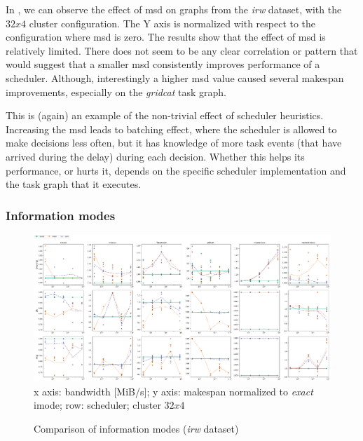 In , we can observe the effect of \gls{msd} on graphs from the
\emph{irw} dataset, with the $32x4$ cluster configuration. The Y axis
is normalized with respect to the configuration where \gls{msd} is zero. The results
show that the effect of \gls{msd} is relatively limited. There does not seem to be
any clear correlation or pattern that would suggest that a smaller \gls{msd}
consistently improves performance of a scheduler. Although, interestingly a higher
\gls{msd} value caused several makespan improvements, especially on the
\emph{gridcat} task graph.

This is (again) an example of the non-trivial effect of scheduler heuristics. Increasing the
\gls{msd} leads to batching effect, where the scheduler is allowed to make decisions
less often, but it has knowledge of more task events (that have arrived during the delay) during
each decision. Whether this helps its performance, or hurts it, depends on the specific scheduler
implementation and the task graph that it executes.

\subsubsection*{Information modes}

\begin{figure}
	\caption{Comparison of information modes (\emph{irw} dataset)}
	\label{fig:estee-chart-irw-imode}
	\centering
	\includegraphics[width=\textwidth]{imgs/estee/charts/irw-32x4-imode-score}\\
	{\small x axis: bandwidth [MiB/s]; y axis: makespan normalized to
	\emph{exact}
	imode; row: scheduler; cluster $32x4$}
\end{figure}


